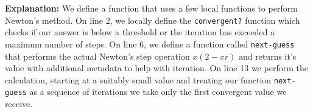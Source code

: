 {\color{blue}
\textbf{Explanation: } We define a function that uses a few local
functions to perform Newton's method. On line 2, we locally define the
\texttt{convergent?} function which checks if our answer is below a
threshold or the iteration has exceeded a maximum number of steps. On
line 6, we define a function called \texttt{next-guess} that performs
the actual Newton's step operation $x(2 - xr)$ and returns it's value
with additional metadata to help with iteration. On line 13 we perform
the calculation, starting at a suitably small value and treating our
function \texttt{next-guess} as a sequence of iterations we take only
the first convergent value we receive.
}

